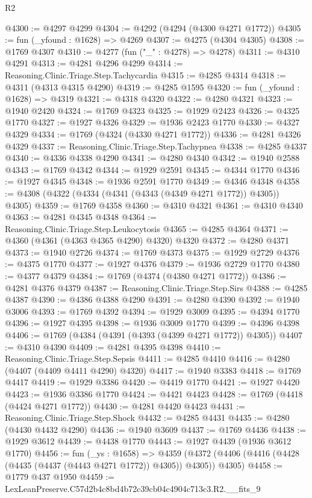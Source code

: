 \begin{lexlean}{R2}
\begin{coremodule}
@4300 := @4297 @4299
@4304 := @4292 (@4294 (@4300 @4271 @1772))
@4305 := fun (_yfound : @1628) => @4269
@4307 := @4275 (@4304 @4305)
@4308 := @1769 @4307
@4310 := @4277 (fun ("_" : @4278) => @4278)
@4311 := @4310 @4291
@4313 := @4281 @4296 @4299
@4314 := Reasoning.Clinic.Triage.Step.Tachycardia
@4315 := @4285 @4314
@4318 := @4311 (@4313 @4315 @4290)
@4319 := @4285 @1595
@4320 := fun (_yfound : @1628) => @4319
@4321 := @4318 @4320
@4322 := @4280 @4321
@4323 := @1940 @2420
@4324 := @1769 @4323
@4325 := @1929 @2423
@4326 := @4325 @1770
@4327 := @1927 @4326
@4329 := @1936 @2423 @1770
@4330 := @4327 @4329
@4334 := @1769 (@4324 (@4330 @4271 @1772))
@4336 := @4281 @4326 @4329
@4337 := Reasoning.Clinic.Triage.Step.Tachypnea
@4338 := @4285 @4337
@4340 := @4336 @4338 @4290
@4341 := @4280 @4340
@4342 := @1940 @2588
@4343 := @1769 @4342
@4344 := @1929 @2591
@4345 := @4344 @1770
@4346 := @1927 @4345
@4348 := @1936 @2591 @1770
@4349 := @4346 @4348
@4358 := @4308 (@4322 (@4334 (@4341 (@4343 (@4349 @4271 @1772)) @4305)) @4305)
@4359 := @1769 @4358
@4360 := @4310 @4321
@4361 := @4310 @4340
@4363 := @4281 @4345 @4348
@4364 := Reasoning.Clinic.Triage.Step.Leukocytosis
@4365 := @4285 @4364
@4371 := @4360 (@4361 (@4363 @4365 @4290) @4320) @4320
@4372 := @4280 @4371
@4373 := @1940 @2726
@4374 := @1769 @4373
@4375 := @1929 @2729
@4376 := @4375 @1770
@4377 := @1927 @4376
@4379 := @1936 @2729 @1770
@4380 := @4377 @4379
@4384 := @1769 (@4374 (@4380 @4271 @1772))
@4386 := @4281 @4376 @4379
@4387 := Reasoning.Clinic.Triage.Step.Sirs
@4388 := @4285 @4387
@4390 := @4386 @4388 @4290
@4391 := @4280 @4390
@4392 := @1940 @3006
@4393 := @1769 @4392
@4394 := @1929 @3009
@4395 := @4394 @1770
@4396 := @1927 @4395
@4398 := @1936 @3009 @1770
@4399 := @4396 @4398
@4406 := @1769 (@4384 (@4391 (@4393 (@4399 @4271 @1772)) @4305))
@4407 := @4310 @4390
@4409 := @4281 @4395 @4398
@4410 := Reasoning.Clinic.Triage.Step.Sepsis
@4411 := @4285 @4410
@4416 := @4280 (@4407 (@4409 @4411 @4290) @4320)
@4417 := @1940 @3383
@4418 := @1769 @4417
@4419 := @1929 @3386
@4420 := @4419 @1770
@4421 := @1927 @4420
@4423 := @1936 @3386 @1770
@4424 := @4421 @4423
@4428 := @1769 (@4418 (@4424 @4271 @1772))
@4430 := @4281 @4420 @4423
@4431 := Reasoning.Clinic.Triage.Step.Shock
@4432 := @4285 @4431
@4435 := @4280 (@4430 @4432 @4290)
@4436 := @1940 @3609
@4437 := @1769 @4436
@4438 := @1929 @3612
@4439 := @4438 @1770
@4443 := @1927 @4439 (@1936 @3612 @1770)
@4456 := fun (_ys : @1658) =>
  @4359 (@4372 (@4406 (@4416 (@4428 (@4435 (@4437 (@4443 @4271 @1772)) @4305)) @4305)) @4305)
@4458 := @1779 @437 @1950
@4459 := LexLeanPreserve.C57d2b4c8bd4b72c39cb04c4904c713c3.R2.__fits_9

\end{coremodule}
\end{lexlean}
